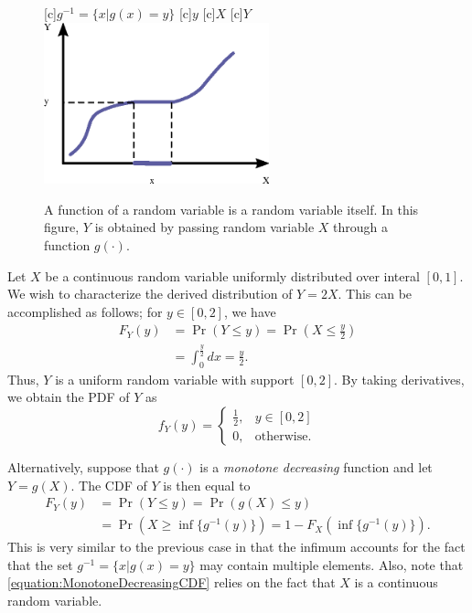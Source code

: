 \begin{figure}[ht]
\begin{center}
\begin{psfrags}
[c]{$g^{-1} = \{ x | g(x) = y \}$}
[c]{$y$}
[c]{$X$}
[c]{$Y$}
\includegraphics[width=6.5cm]{Figures/9Chapter/MonotoneIncreasing}
\end{psfrags}
\caption{A function of a random variable is a random variable itself.
In this figure, $Y$ is obtained by passing random variable $X$ through a function $g(\cdot)$.}
\end{center}
\end{figure}

\begin{example}
Let $X$ be a continuous random variable uniformly distributed over interal $[0, 1]$.
We wish to characterize the derived distribution of $Y = 2X$.
This can be accomplished as follows; for $y \in [0, 2]$, we have
\begin{equation*}
\begin{split}
F_Y(y) &= \Pr (Y \leq y) = \Pr \left( X \leq \frac{y}{2} \right) \\
&= \int_0^{\frac{y}{2}} dx = \frac{y}{2} .
\end{split}
\end{equation*}
Thus, $Y$ is a uniform random variable with support $[0, 2]$.
By taking derivatives, we obtain the PDF of $Y$ as
\begin{equation*}
f_Y(y) = \begin{cases} \frac{1}{2}, & y \in [0, 2] \\
0, & \text{otherwise}. \end{cases}
\end{equation*}
\end{example}

Alternatively, suppose that $g(\cdot)$ is a \emph{monotone decreasing} function and let $Y = g(X)$.
The CDF of $Y$ is then equal to
\begin{equation} \label{equation:MonotoneDecreasingCDF}
\begin{split}
F_Y(y) &= \Pr (Y \leq y) = \Pr (g(X) \leq y) \\
&= \Pr \left( X \geq \inf \{ g^{-1} (y) \} \right)
= 1 - F_X \left( \inf \{ g^{-1} (y) \} \right) .
\end{split}
\end{equation}
This is very similar to the previous case in that the infimum accounts for the fact that the set $g^{-1} = \{ x | g(x) = y \}$ may contain multiple elements.
Also, note that \eqref{equation:MonotoneDecreasingCDF} relies on the fact that $X$ is a continuous random variable.


